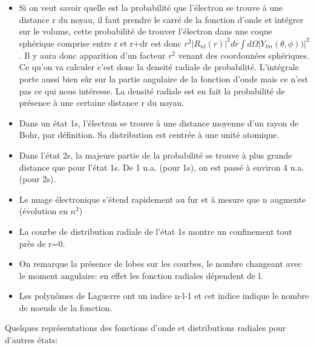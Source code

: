 \begin{itemize}[label=$\bullet$]
    \item Si on veut savoir quelle est la probabilité que l'électron se trouve à une distance r du noyau, il faut prendre le carré de la fonction d'onde et intégrer sur le volume, cette probabilité de trouver l'électron dans une coque sphérique comprise entre r et r+dr est donc $r^2|R_{nl}(r)|^2dr\int d\Omega |Y_{lm}(\theta,\phi))|^2$. Il y aura donc apparition d'un facteur $r^2$ venant des coordonnées sphériques. Ce qu'on va calculer c'est donc la densité radiale de probabilité. L'intégrale porte aussi bien sûr sur la partie angulaire de la fonction d'onde mais ce n'est pas ce qui nous intéresse. La densité radiale est en fait la probabilité de présence à une certaine distance r du noyau. 
    \item Dans un état 1s, l'électron se trouve à une distance moyenne d'un rayon de Bohr, par définition. Sa distribution est centrée à une unité atomique.
    \item Dans l'état 2s, la majeure partie de la probabilité se trouve à plus grande distance que pour l'état 1s. De 1 u.a. (pour 1s), on est passé à environ 4 u.a. (pour 2s). 
    \item Le nuage électronique s'étend rapidement au fur et à mesure que n augmente (évolution en $n^2$)
    \item La courbe de distribution radiale de l'état 1s montre un confinement tout près de r=0. 
    \item On remarque la présence de lobes sur les courbes, le nombre changeant avec le moment angulaire: en effet les fonction radiales dépendent de l. 
    \item Les polynômes de Laguerre ont un indice n-l-1 et cet indice indique le nombre de noeuds de la fonction. 
\end{itemize}

Quelques représentations des fonctions d'onde et distributions radiales pour d'autres états:

